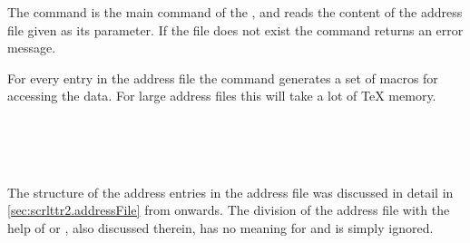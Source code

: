 \begin{Declaration}
\end{Declaration}%
%
The command  is the main command of the
, and reads the content of the address
file given as its parameter.  If the file does not
exist the command returns an error message.

For every entry in the address file the command generates a set of
macros for accessing the data. For large address files this will take
a lot of {\TeX} memory. 

\begin{Declaration}%
  \\
  \\
  \\
\end{Declaration}%
%
%
%
%

The structure of the address entries in the address file was discussed
in detail in \autoref{sec:scrlttr2.addressFile} from
 onwards.  The division of
the address file with the help of  or ,
also discussed therein, has no meaning for  and is
simply ignored.


